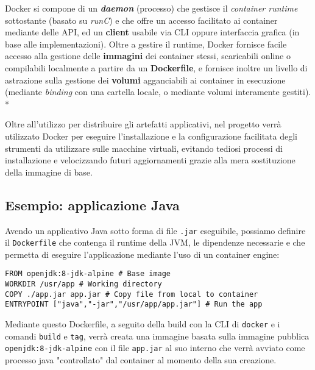 \documentclass[../main.tex]{subfiles}
\begin{document}
    	    Docker si compone di un \textbf{\emph{daemon}} (processo) che gestisce il \emph{container runtime} sottostante (basato su \emph{runC}) e che offre un accesso facilitato ai container mediante delle API, ed un \textbf{client} usabile via CLI oppure interfaccia grafica (in base alle implementazioni). Oltre a gestire il runtime, Docker fornisce facile accesso alla gestione delle \textbf{immagini} dei container stessi, scaricabili online o compilabili localmente a partire da un \textbf{Dockerfile}, e fornisce inoltre un livello di astrazione sulla gestione dei \textbf{volumi} agganciabili ai container in esecuzione (mediante \emph{binding} con una cartella locale, o mediante volumi interamente gestiti).\\*
    	    
    	    Oltre all'utilizzo per distribuire gli artefatti applicativi, nel progetto verrà utilizzato Docker per eseguire l'installazione e la configurazione facilitata degli strumenti da utilizzare sulle macchine virtuali, evitando tediosi processi di installazione e velocizzando futuri aggiornamenti grazie alla mera sostituzione della immagine di base.
    	    
    	    \subsection{Esempio: applicazione Java}
    	    
    	        Avendo un applicativo Java sotto forma di file \verb|.jar| eseguibile, possiamo definire il \verb|Dockerfile| che contenga il runtime della JVM, le dipendenze necessarie e che permetta di eseguire l'applicazione mediante l'uso di un container engine:
    	        \begin{lstlisting}[language=docker]
FROM openjdk:8-jdk-alpine # Base image
WORKDIR /usr/app # Working directory
COPY ./app.jar app.jar # Copy file from local to container
ENTRYPOINT ["java","-jar","/usr/app/app.jar"] # Run the app
    	        \end{lstlisting}
    	        
    	        Mediante questo Dockerfile, a seguito della build con la CLI di \verb|docker| e i comandi \verb|build| e \verb|tag|, verrà creata una immagine basata sulla immagine pubblica \verb|openjdk:8-jdk-alpine| con il file \verb|app.jar| al suo interno che verrà avviato come processo java "controllato" dal container al momento della sua creazione.
    	        
\end{document}
